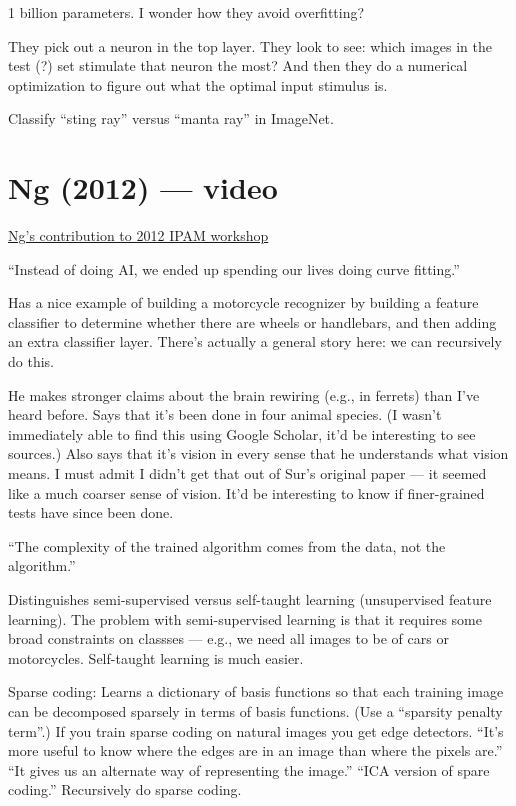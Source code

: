 \documentclass[12pt]{report}
\newcommand{\link}[2]{\href{#1}{#2}}
\begin{document}
1 billion parameters.  I wonder how they avoid overfitting?

They pick out a neuron in the top layer.  They look to see: which
images in the test (?) set stimulate that neuron the most?  And then
they do a numerical optimization to figure out what the optimal input
stimulus is.

Classify ``sting ray'' versus ``manta ray'' in ImageNet.

\section{Ng (2012) --- video}

\link{https://www.ipam.ucla.edu/schedule.aspx?pc=gss2012}{Ng's
  contribution to 2012 IPAM workshop}

``Instead of doing AI, we ended up spending our lives doing curve
fitting.''

Has a nice example of building a motorcycle recognizer by building a
feature classifier to determine whether there are wheels or
handlebars, and then adding an extra classifier layer.  There's
actually a general story here: we can recursively do this.

He makes stronger claims about the brain rewiring (e.g., in ferrets)
than I've heard before.  Says that it's been done in four animal
species.  (I wasn't immediately able to find this using Google
Scholar, it'd be interesting to see sources.)  Also says that it's
vision in every sense that he understands what vision means.  I must
admit I didn't get that out of Sur's original paper --- it seemed like
a much coarser sense of vision.  It'd be interesting to know if
finer-grained tests have since been done.

``The complexity of the trained algorithm comes from the data, not the
algorithm.''

Distinguishes semi-supervised versus self-taught learning
(unsupervised feature learning).  The problem with semi-supervised
learning is that it requires some broad constraints on classses ---
e.g., we need all images to be of cars or motorcycles.  Self-taught
learning is much easier.

Sparse coding: Learns a dictionary of basis functions so that each
training image can be decomposed sparsely in terms of basis functions.
(Use a ``sparsity penalty term''.)  If you train sparse coding on
natural images you get edge detectors.  ``It's more useful to know
where the edges are in an image than where the pixels are.''  ``It
gives us an alternate way of representing the image.''  ``ICA version
of spare coding.''  Recursively do sparse coding.
\end{document}
